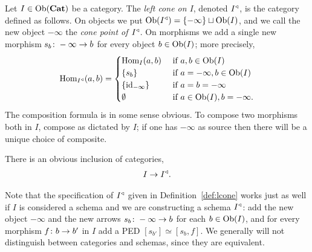 \documentclass[CT4S-EN-RU]{subfiles}
\begin{document}
\begin{definitionENG}\label{def:lcone}
Let $I\in\textnormal{Ob}({\mathbf{Cat}})$ be a category. The {\em left cone on $I$}, denoted $I^\triangleleft$, is the category defined as follows. On objects we put $\textnormal{Ob}(I^\triangleleft)=\{-\infty\}\sqcup\textnormal{Ob}(I)$, and we call the new object $-\infty$ the {\em cone point of $I^\triangleleft$}. On morphisms we add a single new morphism $s_b\colon-\infty\rightarrow b$ for every object $b\in\textnormal{Ob}(I)$; more precisely,
$$\textnormal{Hom}_{I^\triangleleft}(a,b)=
\begin{cases}
\textnormal{Hom}_I(a,b)&\textnormal{ if }a,b\in\textnormal{Ob}(I)\\
\{s_b\}&\textnormal{ if }a=-\infty, b\in\textnormal{Ob}(I)\\
\{\textnormal{id}_{-\infty}\}&\textnormal{ if } a=b=-\infty\\
\emptyset&\textnormal{ if } a\in\textnormal{Ob}(I), b=-\infty.
\end{cases}$$
The composition formula is in some sense obvious. To compose two morphisms both in $I$, compose as dictated by $I$; if one has $-\infty$ as source then there will be a unique choice of composite.

There is an obvious inclusion of categories,
\begin{align}\label{dia:inclusion into cone}
I\rightarrow I^\triangleleft.
\end{align}
\end{definitionENG}

\begin{definitionRUS}\label{def:lcone}
\end{definitionRUS}

\begin{remarkENG}\label{rem:schemas are cats!}
Note that the specification of $I^\triangleleft$ given in Definition~\ref{def:lcone} works just as well if $I$ is considered a schema and we are constructing a schema $I^\triangleleft$: add the new object $-\infty$ and the new arrows $s_b\colon-\infty\rightarrow b$ for each $b\in\textnormal{Ob}(I)$, and for every morphism $f\colon b\rightarrow b'$ in $I$ add a PED $[s_{b'}]\simeq[s_b,f]$. We generally will not distinguish between categories and schemas, since they are equivalent.
\end{remarkENG}

\begin{remarkRUS}\label{rem:schemas are cats!}
\end{remarkRUS}
\end{document}
